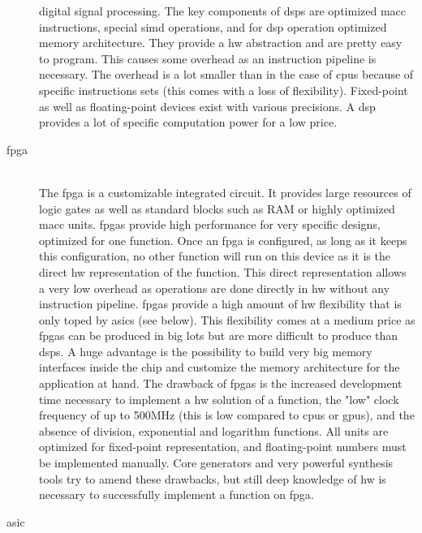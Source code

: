 \documentclass[mscthesis]{usiinfthesis}
\begin{document}
\begin{description}
        digital signal processing. The key components of \glspl{dsp} are
        optimized \gls{macc} instructions, special \gls{simd}
        operations, and for \gls{dsp} operation optimized memory architecture.
        They provide a \gls{hw} abstraction and are pretty easy to program.
        This causes some overhead as an instruction pipeline is necessary. The
        overhead is a lot smaller than in the case of \glspl{cpu} because of
        specific instructions sets (this comes with a loss of flexibility).
        Fixed-point as well as floating-point devices exist with various
        precisions. A \gls{dsp} provides a lot of specific computation power
        for a low price.
    \item[\acrshort{fpga}] \hfill \\
        The \acrfull{fpga} is a customizable integrated circuit. It provides
        large resources of logic gates as well as standard blocks such as RAM
        or highly optimized \gls{macc} units. \glspl{fpga} provide
        high performance for very specific designs, optimized for one function.
        Once an \gls{fpga} is configured, as long as it keeps this
        configuration, no other function will run on this device as it is the
        direct \gls{hw} representation of the function. This direct
        representation allows a very low overhead as operations are done
        directly in \gls{hw} without any instruction pipeline. \glspl{fpga}
        provide a high amount of \gls{hw} flexibility that is only toped by
        \glspl{asic} (see below). This flexibility comes at a medium price as
        \glspl{fpga} can be produced in big lots but are more difficult to
        produce than \glspl{dsp}. A huge advantage is the possibility to
        build very big memory interfaces inside the chip and customize the
        memory architecture for the application at hand. The drawback of
        \glspl{fpga} is the increased development time necessary to implement
        a \gls{hw} solution of a function, the "low" clock frequency of up to
        500MHz (this is low compared to \glspl{cpu} or \glspl{gpu}), and the
        absence of division, exponential and logarithm functions. All units are
        optimized for fixed-point representation, and floating-point numbers
        must be implemented manually. Core generators and very powerful
        synthesis tools try to amend these drawbacks, but still deep
        knowledge of \gls{hw} is necessary to successfully implement a function
        on \gls{fpga}.
    \item[\acrshort{asic}] \hfill \\

\end{description}
\end{document}
